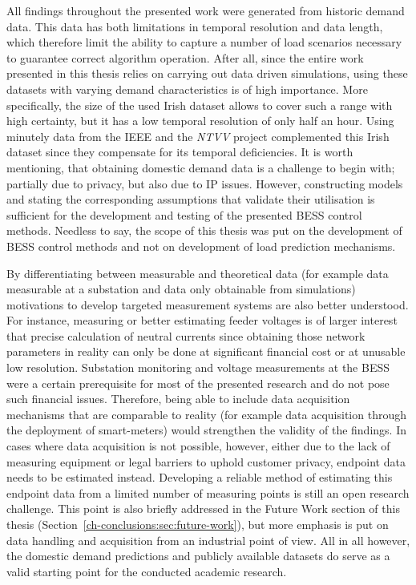 All findings throughout the presented work were generated from historic demand data.
This data has both limitations in temporal resolution and data length, which therefore limit the ability to capture a number of load scenarios necessary to guarantee correct algorithm operation.
After all, since the entire work presented in this thesis relies on carrying out data driven simulations, using these datasets with varying demand characteristics is of high importance.
More specifically, the size of the used Irish dataset allows to cover such a range with high certainty, but it has a low temporal resolution of only half an hour.
Using minutely data from the IEEE and the \textit{NTVV} project complemented this Irish dataset since they compensate for its temporal deficiencies.
It is worth mentioning, that obtaining domestic demand data is a challenge to begin with; partially due to privacy, but also due to IP issues.
However, constructing models and stating the corresponding assumptions that validate their utilisation is sufficient for the development and testing of the presented BESS control methods.
Needless to say, the scope of this thesis was put on the development of BESS control methods and not on development of load prediction mechanisms.

By differentiating between measurable and theoretical data (for example data measurable at a substation and data only obtainable from simulations) motivations to develop targeted measurement systems are also better understood.
For instance, measuring or better estimating feeder voltages is of larger interest that precise calculation of neutral currents since obtaining those network parameters in reality can only be done at significant financial cost or at unusable low resolution.
Substation monitoring and voltage measurements at the BESS were a certain prerequisite for most of the presented research and do not pose such financial issues.
Therefore, being able to include data acquisition mechanisms that are comparable to reality (for example data acquisition through the deployment of smart-meters) would strengthen the validity of the findings.
In cases where data acquisition is not possible, however, either due to the lack of measuring equipment or legal barriers to uphold customer privacy, endpoint data needs to be estimated instead.
Developing a reliable method of estimating this endpoint data from a limited number of measuring points is still an open research challenge.
This point is also briefly addressed in the Future Work section of this thesis (Section~\ref{ch-conclusions:sec:future-work}), but more emphasis is put on data handling and acquisition from an industrial point of view.
All in all however, the domestic demand predictions and publicly available datasets do serve as a valid starting point for the conducted academic research.

